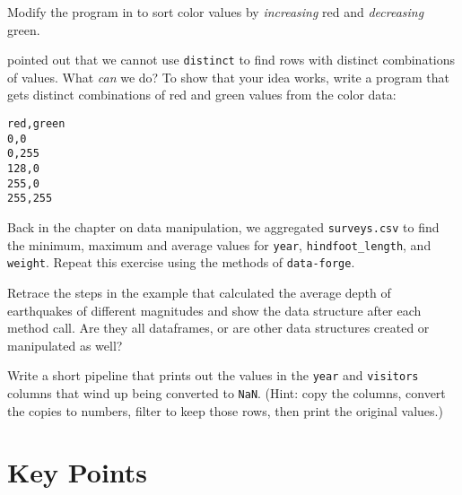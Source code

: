 
Modify the program in  to sort color values
by \emph{increasing} red and \emph{decreasing} green.


 pointed out that we cannot use \texttt{distinct}
to find rows with distinct combinations of values.
What \emph{can} we do?
To show that your idea works,
write a program that gets distinct combinations of red and green values from the color data:

\begin{verbatim}
red,green
0,0
0,255
128,0
255,0
255,255
\end{verbatim}


Back in the chapter on data manipulation,
we aggregated \texttt{surveys.csv} to find the minimum, maximum and average values 
for \texttt{year}, \texttt{hindfoot\_length}, and \texttt{weight}.
Repeat this exercise using the methods of \texttt{data-forge}.


Retrace the steps in the example that calculated
the average depth of earthquakes of different magnitudes
and show the data structure after each method call.
Are they all dataframes,
or are other data structures created or manipulated as well?


Write a short pipeline that prints out the values in the \texttt{year} and \texttt{visitors} columns
that wind up being converted to \texttt{NaN}.
(Hint: copy the columns, convert the copies to numbers, filter to keep those rows, then print the original values.)

\section*{Key Points}


